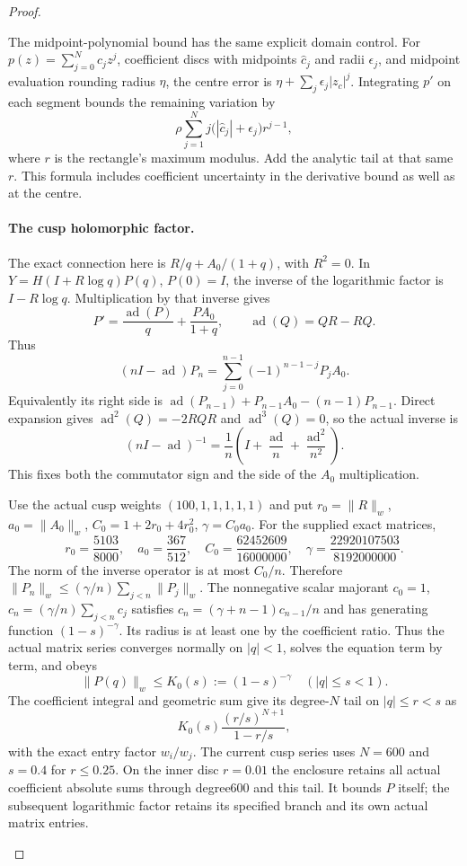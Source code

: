 \begin{proof}
\begin{enumerate}[label=\arabic*.]
The midpoint-polynomial bound has the same explicit domain
control. For $p(z)=\sum_{j=0}^Nc_jz^j$, coefficient discs with
midpoints $\widehat c_j$ and radii $\epsilon_j$, and midpoint
evaluation rounding radius $\eta$, the centre error is
$\eta+\sum_j\epsilon_j|z_c|^j$. Integrating $p'$ on each segment
bounds the remaining variation by
\[
 \rho\sum_{j=1}^N j\bigl(|\widehat c_j|+\epsilon_j\bigr)r^{j-1},
\]
where $r$ is the rectangle's maximum modulus. Add the analytic
tail at that same $r$. This formula includes coefficient
uncertainty in the derivative bound as well as at the centre.

\paragraph{The cusp holomorphic factor.}
The exact connection here is
$R/q+A_0/(1+q)$, with $R^2=0$. In
$Y=H(I+R\log q)P(q)$, $P(0)=I$, the inverse of the logarithmic
factor is $I-R\log q$. Multiplication by that inverse gives
\[
 P'=\frac{\operatorname{ad}(P)}q+\frac{PA_0}{1+q},
 \qquad\operatorname{ad}(Q)=QR-RQ.
\]
Thus
\[
 (nI-\operatorname{ad})P_n
  =\sum_{j=0}^{n-1}(-1)^{n-1-j}P_jA_0.
\]
Equivalently its right side is
$\operatorname{ad}(P_{n-1})+P_{n-1}A_0-(n-1)P_{n-1}$.
Direct expansion gives
$\operatorname{ad}^2(Q)=-2RQR$ and
$\operatorname{ad}^3(Q)=0$, so the actual inverse is
\[
 (nI-\operatorname{ad})^{-1}
  =\frac1n\left(I+\frac{\operatorname{ad}}n
                   +\frac{\operatorname{ad}^2}{n^2}\right).
\]
This fixes both the commutator sign and the side of the $A_0$
multiplication.

Use the actual cusp weights $(100,1,1,1,1,1)$ and put
$r_0=\|R\|_w$, $a_0=\|A_0\|_w$,
$C_0=1+2r_0+4r_0^2$, $\gamma=C_0a_0$. For the supplied exact
matrices,
\[
 r_0=\frac{5103}{8000},\quad a_0=\frac{367}{512},\quad
 C_0=\frac{62452609}{16000000},\quad
 \gamma=\frac{22920107503}{8192000000}.
\]
The norm of the inverse operator is at most $C_0/n$. Therefore
$\|P_n\|_w\le(\gamma/n)\sum_{j<n}\|P_j\|_w$.
The nonnegative scalar majorant $c_0=1$,
$c_n=(\gamma/n)\sum_{j<n}c_j$ satisfies
$c_n=(\gamma+n-1)c_{n-1}/n$ and has generating function
$(1-s)^{-\gamma}$. Its radius is at least one by the coefficient
ratio. Thus the actual matrix series converges normally on
$|q|<1$, solves the equation term by term, and obeys
\[
 \|P(q)\|_w\le K_0(s):=(1-s)^{-\gamma}\quad(|q|\le s<1).
\]
The coefficient integral and geometric sum give its degree-$N$
tail on $|q|\le r<s$ as
\[
 K_0(s)\frac{(r/s)^{N+1}}{1-r/s},
\]
with the exact entry factor $w_i/w_j$. The current cusp series
uses $N=600$ and $s=0.4$ for $r\le0.25$. On the inner disc
$r=0.01$ the enclosure retains all actual coefficient absolute
sums through degree600 and this tail. It bounds $P$ itself;
the subsequent logarithmic factor retains its specified branch
and its own actual matrix entries.


\end{enumerate}
\end{proof}
